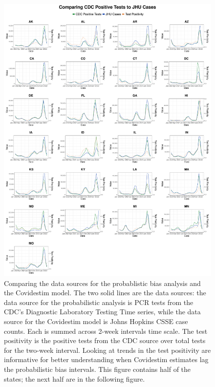 \documentclass[12pt,twoside]{smiththesis}
\begin{document}
\begin{figure}

{\centering \includegraphics[width=1\linewidth]{figure/jhu_cdc_all_states_1} 

}

\caption{\label{fig:jhu-cdc-all}Comparing the data sources for the probablistic bias analysis and the Covidestim model. The two solid lines are the data sources: the data source for the probabilistic analysis is PCR tests from the CDC's Diagnostic Laboratory Testing Time series, while the data source for the Covidestim model is Johns Hopkins CSSE case counts. Each is summed across 2-week intervals time scale. The test positivity is the positive tests from the CDC source over total tests for the two-week interval. Looking at trends in the test positivity are informative for better understanding when Covidestim estimates lag the probabilistic bias intervals. This figure contains half of the states; the next half are in the following figure.}\label{fig:unnamed-chunk-110}
\end{figure}
\end{document}
